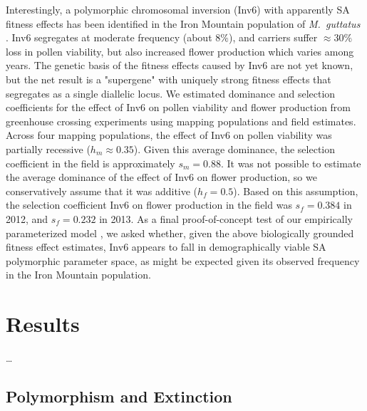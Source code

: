 \documentclass[11pt]{article}
\begin{document}
Interestingly, a polymorphic chromosomal inversion (Inv6) with apparently SA fitness effects has been identified in the Iron Mountain population of {\itshape M.~guttatus} \citep{LeeKelly2015}. Inv6 segregates at moderate frequency (about $8\%$), and carriers suffer $\approx 30 \%$ loss in pollen viability, but also increased flower production which varies among years. The genetic basis of the fitness effects caused by Inv6 are not yet known, but the net result is a "supergene" with uniquely strong fitness effects that segregates as a single diallelic locus. We estimated dominance and selection coefficients for the effect of Inv6 on pollen viability and flower production from greenhouse crossing experiments using mapping populations and field estimates. Across four mapping populations, the effect of Inv6 on pollen viability was partially recessive ($h_m \approx 0.35$). Given this average dominance, the selection coefficient in the field is approximately $s_m = 0.88$. It was not possible to estimate the average dominance of the effect of Inv6 on flower production, so we conservatively assume that it was additive ($h_f = 0.5$). Based on this assumption, the selection coefficient Inv6 on flower production in the field was $s_f = 0.384$ in 2012, and $s_f = 0.232$ in 2013. As a final proof-of-concept test of our empirically parameterized model \citep[e.g.,][]{Servedio2014}, we asked whether, given the above biologically grounded fitness effect estimates, Inv6 appears to fall in demographically viable SA polymorphic parameter space, as might be expected given its observed frequency in the Iron Mountain population.


\section*{Results}
\ldots


\subsection*{Polymorphism and Extinction} \label{sec:Res:PolyExt}
\end{document}

